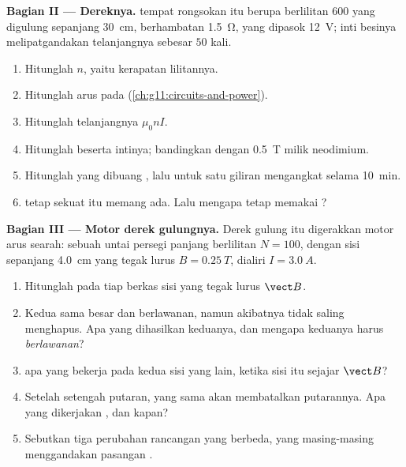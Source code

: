 \begin{problem}
\medskip
\noindent\textbf{Bagian II --- Dereknya.}
 tempat rongsokan itu berupa  berlilitan $600$
yang digulung sepanjang \qty{30}{cm}, berhambatan \qty{1.5}{\ohm}, yang
dipasok \qty{12}{V}; inti besinya melipatgandakan  telanjangnya
sebesar $50$ kali.
\begin{enumerate}[resume]
  \item Hitunglah $n$, yaitu kerapatan lilitannya.
  \item Hitunglah arus pada 
        (\cref{ch:g11:circuits-and-power}).
  \item Hitunglah   telanjangnya $\mu_0 n I$.
  \item Hitunglah  beserta intinya; bandingkan dengan
        \qty{0.5}{T} milik neodimium.
  \item Hitunglah  yang dibuang , lalu  untuk
        satu giliran mengangkat selama \qty{10}{\minute}.
  \item {} tetap sekuat itu memang ada. Lalu mengapa tetap memakai
        ?
\end{enumerate}

\medskip
\noindent\textbf{Bagian III --- Motor derek gulungnya.}
Derek gulung itu digerakkan motor arus searah: sebuah untai persegi
panjang berlilitan $N = 100$, dengan sisi sepanjang \qty{4.0}{cm} yang
tegak lurus $B = \qty{0.25}{T}$, dialiri $I = \qty{3.0}{A}$.
\begin{enumerate}[resume]
  \item Hitunglah  pada tiap berkas sisi yang tegak lurus
        $\vect B$.
  \item Kedua  sama besar dan berlawanan, namun akibatnya tidak
        saling menghapus. Apa yang dihasilkan keduanya, dan mengapa
        keduanya harus \emph{berlawanan}?
  \item {} apa yang bekerja pada kedua sisi yang lain, ketika sisi
        itu sejajar $\vect B$?
  \item Setelah setengah putaran,  yang sama akan membatalkan
        putarannya. Apa yang dikerjakan , dan kapan?
  \item Sebutkan tiga perubahan rancangan yang berbeda, yang
        masing-masing menggandakan pasangan .
\end{enumerate}


\end{problem}
